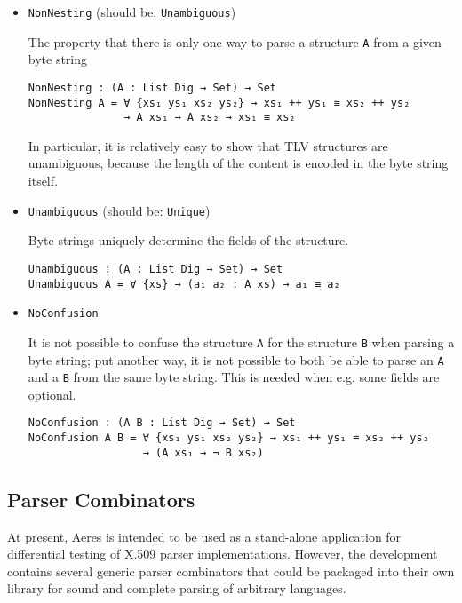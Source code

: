 \documentclass[11pt]{article}
\begin{document}
\begin{itemize}
\item \texttt{NonNesting} (should be: \texttt{Unambiguous})

The property that there is only one way to parse a structure \texttt{A} from a
given byte string

\begin{verbatim}
NonNesting : (A : List Dig → Set) → Set
NonNesting A = ∀ {xs₁ ys₁ xs₂ ys₂} → xs₁ ++ ys₁ ≡ xs₂ ++ ys₂
               → A xs₁ → A xs₂ → xs₁ ≡ xs₂
\end{verbatim}

In particular, it is relatively easy to show that TLV structures are
unambiguous, because the length of the content is encoded in the byte string
itself.

\item \texttt{Unambiguous} (should be: \texttt{Unique})

Byte strings uniquely determine the fields of the structure.

\begin{verbatim}
Unambiguous : (A : List Dig → Set) → Set
Unambiguous A = ∀ {xs} → (a₁ a₂ : A xs) → a₁ ≡ a₂
\end{verbatim}

\item \texttt{NoConfusion}

It is not possible to confuse the structure \texttt{A} for the structure \texttt{B} when
parsing a byte string; put another way, it is not possible to both be able
to parse an \texttt{A} and a \texttt{B} from the same byte string. This is needed when e.g.
some fields are optional.

\begin{verbatim}
NoConfusion : (A B : List Dig → Set) → Set
NoConfusion A B = ∀ {xs₁ ys₁ xs₂ ys₂} → xs₁ ++ ys₁ ≡ xs₂ ++ ys₂
                  → (A xs₁ → ¬ B xs₂)
\end{verbatim}
\end{itemize}

\subsection{Parser Combinators}
\label{sec:org36fd9eb}

At present, Aeres is intended to be used as a stand-alone application for
differential testing of X.509 parser implementations.
However, the development contains several generic parser combinators that
could be packaged into their own library for sound and complete parsing of
arbitrary languages.
\end{document}

